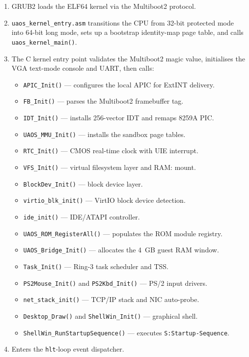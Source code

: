 \documentclass[11pt,a4paper]{report}
\begin{document}
\begin{enumerate}
    \item GRUB2 loads the ELF64 kernel via the Multiboot2 protocol.
    \item \texttt{uaos\_kernel\_entry.asm} transitions the CPU from 32-bit
          protected mode into 64-bit long mode, sets up a bootstrap identity-map
          page table, and calls \texttt{uaos\_kernel\_main()}.
    \item The C kernel entry point validates the Multiboot2 magic value,
          initialises the VGA text-mode console and UART, then calls:
          \begin{itemize}
              \item \texttt{APIC\_Init()} --- configures the local APIC for ExtINT delivery.
              \item \texttt{FB\_Init()} --- parses the Multiboot2 framebuffer tag.
              \item \texttt{IDT\_Init()} --- installs 256-vector IDT and remaps 8259A PIC.
              \item \texttt{UAOS\_MMU\_Init()} --- installs the sandbox page tables.
              \item \texttt{RTC\_Init()} --- CMOS real-time clock with UIE interrupt.
              \item \texttt{VFS\_Init()} --- virtual filesystem layer and RAM: mount.
              \item \texttt{BlockDev\_Init()} --- block device layer.
              \item \texttt{virtio\_blk\_init()} --- VirtIO block device detection.
              \item \texttt{ide\_init()} --- IDE/ATAPI controller.
              \item \texttt{UAOS\_ROM\_RegisterAll()} --- populates the ROM module registry.
              \item \texttt{UAOS\_Bridge\_Init()} --- allocates the 4~GB guest RAM window.
              \item \texttt{Task\_Init()} --- Ring-3 task scheduler and TSS.
              \item \texttt{PS2Mouse\_Init()} and \texttt{PS2Kbd\_Init()} --- PS/2 input drivers.
              \item \texttt{net\_stack\_init()} --- TCP/IP stack and NIC auto-probe.
              \item \texttt{Desktop\_Draw()} and \texttt{ShellWin\_Init()} --- graphical shell.
              \item \texttt{ShellWin\_RunStartupSequence()} --- executes \texttt{S:Startup-Sequence}.
          \end{itemize}
    \item Enters the \texttt{hlt}-loop event dispatcher.
\end{enumerate}
\end{document}

